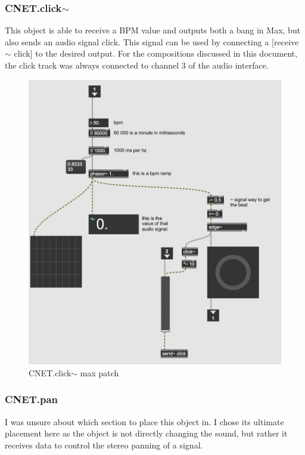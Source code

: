 \subsubsection{CNET.click$\sim$}
This object is able to receive a BPM value and outputs both a bang in Max, but also sends an audio signal click. This signal can be used by connecting a [receive$\sim$ click] to the desired output. For the compositions discussed in this document, the click track was always connected to channel 3 of the audio interface.

\begin{figure}
    \centering
    \includegraphics[scale=0.2]{diagrams/maxPatches/CNET.click~.jpg}
    \caption{CNET.click$\sim$ max patch}
    \label{fig:CNET.clickPAtch}
\end{figure}

\subsubsection{CNET.pan}
I was unsure about which section to place this object in. I chose its ultimate placement here as the object is not directly changing the sound, but rather it receives data to control the stereo panning of a signal.

